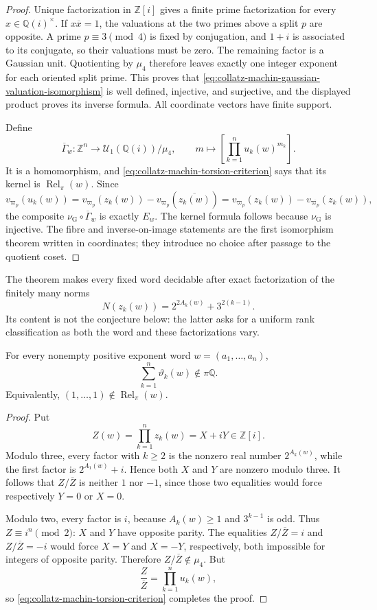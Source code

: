 \begin{proof}
Unique factorization in $\mathbb Z[i]$ gives a finite prime factorization for
every $x\in\mathbb Q(i)^\times$.  If $x\overline{x}=1$, the valuations at the
two primes above a split $p$ are opposite.  A prime $p\equiv3\pmod4$ is fixed
by conjugation, and $1+i$ is associated to its conjugate, so their valuations
must be zero.  The remaining factor is a Gaussian unit.  Quotienting by
$\mu_4$ therefore leaves exactly one integer exponent for each oriented split
prime.  This proves that \eqref{eq:collatz-machin-gaussian-valuation-isomorphism}
is well defined, injective, and surjective, and the displayed product proves
its inverse formula.  All coordinate vectors have finite support.

Define
\[
 \overline{\Gamma}_w:\mathbb Z^n\longrightarrow
 \mathcal U_1(\mathbb Q(i))/\mu_4,
 \qquad
 m\longmapsto\left[\prod_{k=1}^n u_k(w)^{m_k}\right].
\]
It is a homomorphism, and
\eqref{eq:collatz-machin-torsion-criterion} says that its kernel is
$\operatorname{Rel}_{\pi}(w)$.  Since
\[
 v_{\varpi_p}(u_k(w))
 =v_{\varpi_p}(z_k(w))-v_{\varpi_p}(\overline{z_k(w)})
 =v_{\varpi_p}(z_k(w))-v_{\overline{\varpi_p}}(z_k(w)),
\]
the composite $\nu_{\mathrm G}\circ\overline{\Gamma}_w$ is exactly $E_w$.
The kernel formula follows because $\nu_{\mathrm G}$ is injective.  The fibre
and inverse-on-image statements are the first isomorphism theorem written in
coordinates; they introduce no choice after passage to the quotient coset.
\end{proof}

The theorem makes every fixed word decidable after exact factorization of the
finitely many norms
\[
 N(z_k(w))=2^{2A_k(w)}+3^{2(k-1)}.
\]
Its content is not the conjecture below: the latter asks for a uniform rank
classification as both the word and these factorizations vary.

\begin{theorem}
\label{thm:collatz-machin-unweighted-nontorsion}
For every nonempty positive exponent word $w=(a_1,\ldots,a_n)$,
\[
 \sum_{k=1}^n\vartheta_k(w)\notin\pi\mathbb Q.
\]
Equivalently, $(1,\ldots,1)\notin\operatorname{Rel}_{\pi}(w)$.
\end{theorem}

\begin{proof}
Put
\[
 Z(w)=\prod_{k=1}^n z_k(w)=X+iY\in\mathbb Z[i].
\]
Modulo three, every factor with $k\geq2$ is the nonzero real number
$2^{A_k(w)}$, while the first factor is $2^{A_1(w)}+i$.  Hence both $X$ and
$Y$ are nonzero modulo three.  It follows that $Z/\overline Z$ is neither
$1$ nor $-1$, since those two equalities would force respectively $Y=0$ or
$X=0$.

Modulo two, every factor is $i$, because $A_k(w)\geq1$ and $3^{k-1}$ is odd.
Thus $Z\equiv i^n\pmod2$: $X$ and $Y$ have opposite parity.  The equalities
$Z/\overline Z=i$ and $Z/\overline Z=-i$ would force $X=Y$ and $X=-Y$,
respectively, both impossible for integers of opposite parity.  Therefore
$Z/\overline Z\notin\mu_4$.  But
\[
 \frac{Z}{\overline Z}=\prod_{k=1}^n u_k(w),
\]
so \eqref{eq:collatz-machin-torsion-criterion} completes the proof.
\end{proof}

